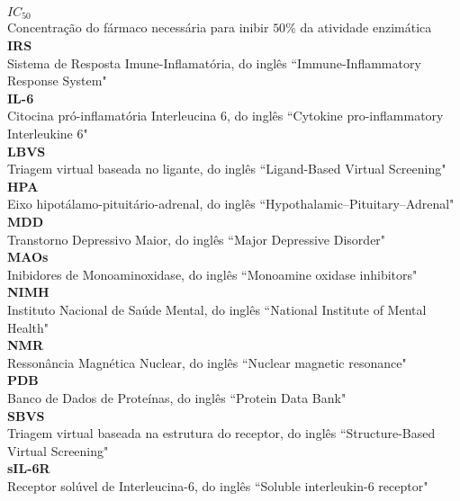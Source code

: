 \textbf{$IC_{50}$} \\ Concentração do fármaco necessária para inibir $50\%$ da atividade enzimática \\

\textbf{IRS} \\   Sistema de Resposta Imune-Inflamatória, do inglês ``Immune-Inflammatory Response System" \\

\textbf{IL-6} \\  Citocina pró-inflamatória Interleucina 6, do inglês ``Cytokine pro-inflammatory Interleukine 6" \\

\textbf{LBVS} \\  Triagem virtual baseada no ligante, do inglês ``Ligand-Based Virtual Screening" \\

\textbf{HPA} \\   Eixo hipotálamo-pituitário-adrenal, do inglês ``Hypothalamic–Pituitary–Adrenal" \\

\textbf{MDD} \\   Transtorno Depressivo Maior, do inglês ``Major Depressive Disorder"\\

\textbf{MAOs} \\  Inibidores de Monoaminoxidase, do inglês ``Monoamine oxidase inhibitors" \\

\textbf{NIMH} \\  Instituto Nacional de Saúde Mental, do inglês ``National Institute of Mental Health" \\

\textbf{NMR}  \\  Ressonância Magnética Nuclear, do inglês ``Nuclear magnetic resonance"\\

\textbf{PDB} \\    Banco de Dados de Proteínas, do inglês ``Protein Data Bank" \\

\textbf{SBVS}  \\   Triagem virtual baseada na estrutura do receptor, do inglês ``Structure-Based Virtual Screening" \\

\textbf{sIL-6R} \\ Receptor solúvel de Interleucina-6, do inglês ``Soluble interleukin-6 receptor" \\

